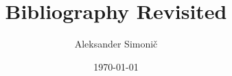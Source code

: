 \documentclass[11pt]{amsart}
\title[Bibliography Revisited]{Bibliography Revisited}
\author{Aleksander Simoni\v{c}}
\date{\today}
\begin{document}
\maketitle
\nocite{*}


\end{document}
